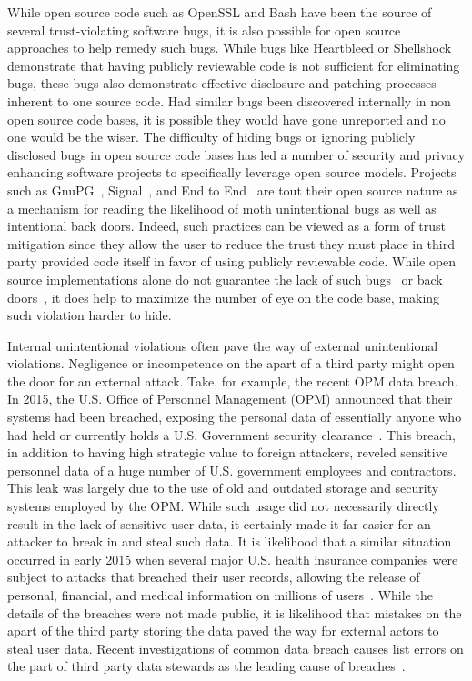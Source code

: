 While open source code such as OpenSSL and Bash have been the source
of several trust-violating software bugs, it is also possible for open
source approaches to help remedy such bugs. While bugs like Heartbleed
or Shellshock demonstrate that having publicly reviewable code is not
sufficient for eliminating bugs, these bugs also demonstrate effective
disclosure and patching processes inherent to one source code. Had
similar bugs been discovered internally in non open source code bases,
it is possible they would have gone unreported and no one would be the
wiser. The difficulty of hiding bugs or ignoring publicly disclosed
bugs in open source code bases has led a number of security and
privacy enhancing software projects to specifically leverage open
source models. Projects such as GnuPG~\cite{gnupg},
Signal~\cite{openwhisper}, and End to End~\cite{google-endtoend,
  yahoo-endtoend} are tout their open source nature as a mechanism for
reading the likelihood of moth unintentional bugs as well as
intentional back doors. Indeed, such practices can be viewed as a form
of trust mitigation since they allow the user to reduce the trust they
must place in third party provided code itself in favor of using
publicly reviewable code. While open source implementations alone do
not guarantee the lack of such bugs~\cite{frosch2014} or
back doors~\cite{thompson1984}, it does help to maximize the number of
eye on the code base, making such violation harder to hide.

Internal unintentional violations often pave the way of external
unintentional violations. Negligence or incompetence on the apart of a
third party might open the door for an external attack. Take, for
example, the recent OPM data breach. In 2015, the U.S. Office of
Personnel Management (OPM) announced that their systems had been
breached, exposing the personal data of essentially anyone who had
held or currently holds a U.S. Government security
clearance~\cite{ars-opmhack, opm-cybersecurityincidents}. This breach,
in addition to having high strategic value to foreign attackers,
reveled sensitive personnel data of a huge number of U.S.  government
employees and contractors. This leak was largely due to the use of old
and outdated storage and security systems employed by the OPM. While
such usage did not necessarily directly result in the lack of
sensitive user data, it certainly made it far easier for an attacker
to break in and steal such data. It is likelihood that a similar
situation occurred in early 2015 when several major U.S. health
insurance companies were subject to attacks that breached their user
records, allowing the release of personal, financial, and medical
information on millions of users~\cite{krebs-anthem,
  krebs-premera}. While the details of the breaches were not made
public, it is likelihood that mistakes on the apart of the third party
storing the data paved the way for external actors to steal user
data. Recent investigations of common data breach causes list errors
on the part of third party data stewards as the leading cause of
breaches~\cite{gallagher-blame, verizon-2016breach}.

